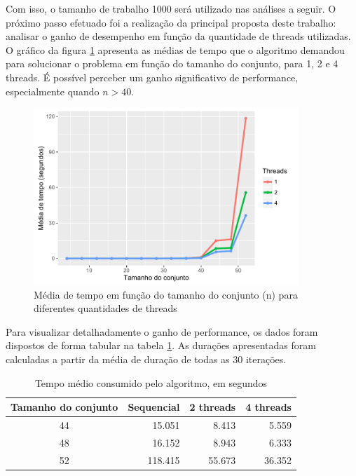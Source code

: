 \documentclass[12pt]{article}
\begin{document}
Com isso, o tamanho de trabalho 1000 será utilizado nas análises a seguir. O próximo passo efetuado foi a realização da principal proposta deste trabalho: analisar o ganho de desempenho em função da quantidade de threads utilizadas. O gráfico da figura \ref{fig:performance} apresenta as médias de tempo que o algoritmo demandou para solucionar o problema em função do tamanho do conjunto, para 1, 2 e 4 threads. É possível perceber um ganho significativo de performance, especialmente quando $n > 40$.

\begin{figure}[ht]
    \centering
    \includegraphics[width=10cm]{performance}
    \caption{Média de tempo em função do tamanho do conjunto (n) para diferentes quantidades de threads}
    \label{fig:performance}
\end{figure}

Para visualizar detalhadamente o ganho de performance, os dados foram dispostos de forma tabular na tabela \ref{tab:speedtable}. As durações apresentadas foram calculadas a partir da média de duração de todas as 30 iterações.

\begin{table}[ht]
    \centering
    \caption{Tempo médio consumido pelo algoritmo, em segundos}
    \label{tab:speedtable}
    \smallskip

    \begingroup
    \renewcommand*{\arraystretch}{1.2}

    \begin{tabular}{|c|r|r|r|}
        \hline
        \textbf{Tamanho do conjunto} & \textbf{Sequencial} & \textbf{2 threads} & \textbf{4 threads} \\
        \hline
        44 & 15.051 & 8.413 & 5.559 \\
        \hline
        48 & 16.152 & 8.943 & 6.333 \\
        \hline
        52 & 118.415 & 55.673 & 36.352 \\
        \hline
    \end{tabular}

    \endgroup

\end{table}
\end{document}
